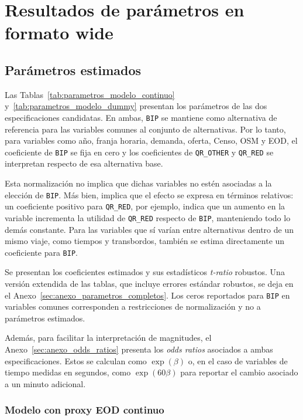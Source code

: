 \section{Resultados de parámetros en formato wide}

\subsection{Parámetros estimados}

Las Tablas~\ref{tab:parametros_modelo_continuo} y~\ref{tab:parametros_modelo_dummy} presentan los
parámetros de las dos especificaciones candidatas. En ambas, \texttt{BIP} se mantiene como
alternativa de referencia para las variables comunes al conjunto de alternativas. Por lo tanto, para
variables como año, franja horaria, demanda, oferta, Censo, OSM y EOD, el coeficiente de
\texttt{BIP} se fija en cero y los coeficientes de \texttt{QR\_OTHER} y \texttt{QR\_RED} se
interpretan respecto de esa alternativa base.

Esta normalización no implica que dichas variables no estén asociadas a la elección de
\texttt{BIP}. Más bien, implica que el efecto se expresa en términos relativos: un coeficiente
positivo para \texttt{QR\_RED}, por ejemplo, indica que un aumento en la variable incrementa la
utilidad de \texttt{QR\_RED} respecto de \texttt{BIP}, manteniendo todo lo demás constante. Para las
variables que sí varían entre alternativas dentro de un mismo viaje, como tiempos y transbordos,
también se estima directamente un coeficiente para \texttt{BIP}.

Se presentan los coeficientes estimados y sus estadísticos \emph{t-ratio} robustos. Una versión
extendida de las tablas, que incluye errores estándar robustos, se deja en el
Anexo~\ref{sec:anexo_parametros_completos}. Los ceros reportados para \texttt{BIP} en variables
comunes corresponden a restricciones de normalización y no a parámetros estimados.

Además, para facilitar la interpretación de magnitudes, el Anexo~\ref{sec:anexo_odds_ratios}
presenta los \emph{odds ratios} asociados a ambas especificaciones. Estos se calculan como
\(\exp(\beta)\) o, en el caso de variables de tiempo medidas en segundos, como \(\exp(60\beta)\)
para reportar el cambio asociado a un minuto adicional.

\subsubsection{Modelo con proxy EOD continuo}

